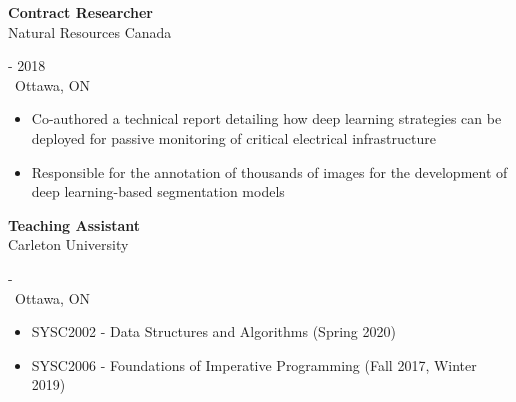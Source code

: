\documentclass[11pt]{article}
\begin{document}
	\vspace{\baselineskip}

	\begin{minipage}[t]{0.8\textwidth}
		{\bf Contract Researcher}\\
		Natural Resources Canada\\
	\end{minipage}
	\begin{minipage}[t]{0.2\textwidth}
		 - 2018\\
		\faMapMarker\ Ottawa, ON
	\end{minipage}
	\begin{itemize}[noitemsep,nolistsep]
			\item Co-authored a technical report detailing how deep learning strategies can be deployed for passive monitoring of critical electrical infrastructure
			\item Responsible for the annotation of thousands of images for the development of deep learning-based segmentation models
	\end{itemize}

	\vspace{\baselineskip}

	\begin{minipage}[t]{0.8\textwidth}
		{\bf Teaching Assistant}\\
		Carleton University\\
	\end{minipage}
	\begin{minipage}[t]{0.2\textwidth}
		 -\ \ \ \ \ \ \ \ \ \\
		\faMapMarker\ Ottawa, ON
	\end{minipage}
	\begin{itemize}[noitemsep,nolistsep]
			\item SYSC2002 - Data Structures and Algorithms (Spring 2020)
			\item SYSC2006 - Foundations of Imperative Programming (Fall 2017, Winter 2019)
	\end{itemize}

	\vspace{\baselineskip}
\end{document}
